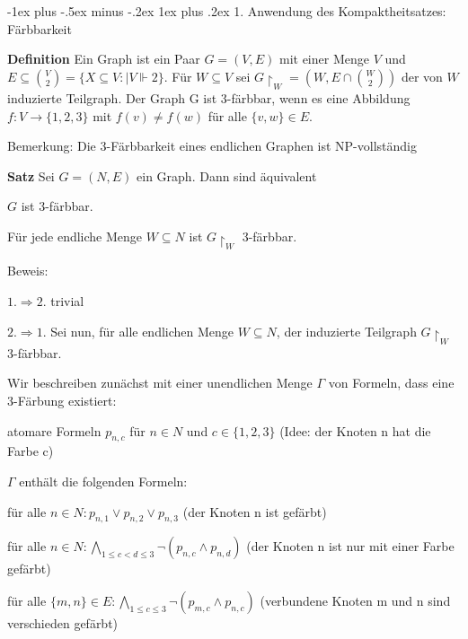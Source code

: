 \documentclass[a4paper]{article}
\makeatletter
\renewcommand{\note}[2]{\begin{noteBox} \textbf{#1} #2 \end{noteBox}}
\renewcommand{\subsubsection}{\@startsection{subsubsection}{3}{0mm}%
                {-1ex plus -.5ex minus -.2ex}%
                {1ex plus .2ex}%
                {\normalfont\small\bfseries}}
\makeatother
\begin{document}
\begin{multicols}{3}
  \subsubsection{1. Anwendung des Kompaktheitsatzes: Färbbarkeit}
  \note{Definition}{Ein Graph ist ein Paar $G=(V,E)$ mit einer Menge $V$ und $E\subseteq\binom{V}{2} =\{X\subseteq V:|V\Vdash 2\}$.
    Für $W\subseteq V$ sei $G\upharpoonright_W= (W,E\cap\binom{W}{2})$ der von $W$ induzierte Teilgraph.
    Der Graph G ist 3-färbbar, wenn es eine Abbildung $f:V\rightarrow\{1,2,3\}$ mit $f(v)\not=f(w)$ für alle $\{v,w\}\in E$.}

  Bemerkung: Die 3-Färbbarkeit eines endlichen Graphen ist NP-vollständig

  \note{Satz}{Sei $G= (N,E)$ ein Graph. Dann sind äquivalent
    \begin{enumerate*}
      \item $G$ ist 3-färbbar.
      \item Für jede endliche Menge $W\subseteq N$ ist $G\upharpoonright_W$ 3-färbbar.
    \end{enumerate*}
  }

  Beweis:
  \begin{itemize*}
    \item $1.\Rightarrow 2.$ trivial
    \item $2.\Rightarrow 1.$ Sei nun, für alle endlichen Menge $W\subseteq N$, der induzierte Teilgraph $G\upharpoonright_W$ 3-färbbar.
  \end{itemize*}

  Wir beschreiben zunächst mit einer unendlichen Menge $\Gamma$ von Formeln, dass eine 3-Färbung existiert:
  \begin{itemize*}
    \item atomare Formeln $p_{n,c}$ für $n\in N$ und $c\in\{1,2,3\}$ (Idee: der Knoten n hat die Farbe c)
    \item $\Gamma$ enthält die folgenden Formeln:
    \begin{itemize*}
      \item für alle $n\in N:p_{n, 1} \vee p_{n, 2} \vee p_{n, 3}$ (der Knoten n ist gefärbt)
      \item für alle $n\in N:\bigwedge_{1\leq c< d \leq 3} \lnot(p_{n,c} \wedge p_{n,d})$ (der Knoten n ist nur mit einer Farbe gefärbt)
      \item für alle $\{m,n\}\in E: \bigwedge_{1\leq c\leq 3} \lnot(p_{m,c} \wedge p_{n,c})$ (verbundene Knoten m und n sind verschieden gefärbt)
    \end{itemize*}
  \end{itemize*}



\end{multicols}
\end{document}
